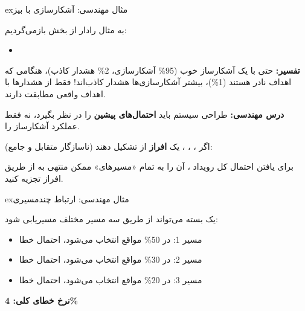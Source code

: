 \begin{PSbox}[unbreakable]{ex}{مثال مهندسی: آشکارسازی با بیز}

به مثال رادار از بخش  بازمی‌گردیم:

\begin{itemize}
\tightlist
\item
\end{itemize}



\textbf{تفسیر:} حتی با یک آشکارساز خوب (95\% آشکارسازی، 2\% هشدار کاذب)، هنگامی که اهداف نادر هستند (1\%)، بیشتر آشکارسازی‌ها هشدار کاذب‌اند! فقط  از هشدارها با اهداف واقعی مطابقت دارند.

\textbf{درس مهندسی:} طراحی سیستم باید \textbf{احتمال‌های پیشین} را در نظر بگیرد، نه فقط عملکرد آشکارساز را.

\end{PSbox}



اگر ، ، ،  یک \textbf{افراز} از  تشکیل دهند (ناسازگار متقابل و جامع):



برای یافتن احتمال کل رویداد ، آن را به تمام «مسیرهای» ممکن منتهی به  از طریق افراز تجزیه کنید.

\begin{PSbox}[unbreakable]{ex}{مثال مهندسی: ارتباط چندمسیری}

یک بسته می‌تواند از طریق سه مسیر مختلف مسیریابی شود:

\begin{itemize}
\tightlist
\item
  مسیر 1: در 50\% مواقع انتخاب می‌شود، احتمال خطا 
\item
  مسیر 2: در 30\% مواقع انتخاب می‌شود، احتمال خطا 
\item
  مسیر 3: در 20\% مواقع انتخاب می‌شود، احتمال خطا 
\end{itemize}

\PSbr{}\PSbr{}

\textbf{نرخ خطای کلی: 4\%}

\end{PSbox}

